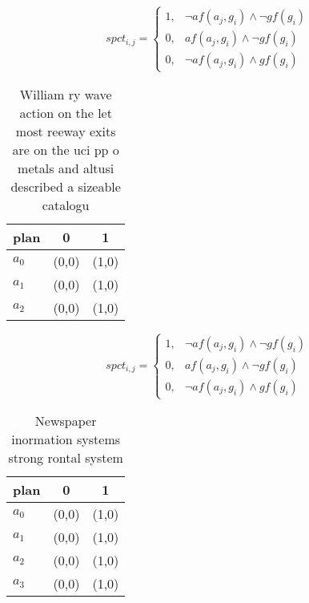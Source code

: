 \documentclass[a4paper]{article}
\begin{document}
\begin{equation}
spct_{i,j} =
\begin{cases}
1, & \text{$\neg af(a_j,g_i) \wedge \neg gf(g_i)$}\\
0, & \text{$af(a_j,g_i) \wedge \neg gf(g_i)$}\\
0, & \text{$\neg af(a_j,g_i) \wedge gf(g_i)$}
\end{cases}
\end{equation}

\begin{table}
\begin{adjustbox}{width=0.7\columnwidth}
\begin{tabular}{|l|l|l|}
\hline
\textbf{plan} & \multicolumn{1}{c|}{\textbf{0}} & \multicolumn{1}{c|}{\textbf{1}} \\ \hline
\textbf{$a_0$}  & (0,0) & (1,0) \\ \hline
\textbf{$a_1$}  & (0,0) & (1,0) \\ \hline
\textbf{$a_2$}  & (0,0) & (1,0) \\ \hline
\end{tabular}
\end{adjustbox}
\caption{William ry wave action on the let most reeway exits are on the uci pp o metals and altusi described a sizeable catalogu
}
\end{table}

\begin{equation}
spct_{i,j} =
\begin{cases}
1, & \text{$\neg af(a_j,g_i) \wedge \neg gf(g_i)$}\\
0, & \text{$af(a_j,g_i) \wedge \neg gf(g_i)$}\\
0, & \text{$\neg af(a_j,g_i) \wedge gf(g_i)$}
\end{cases}
\end{equation}

\begin{table}
\begin{adjustbox}{width=0.7\columnwidth}
\begin{tabular}{|l|l|l|}
\hline
\textbf{plan} & \multicolumn{1}{c|}{\textbf{0}} & \multicolumn{1}{c|}{\textbf{1}} \\ \hline
\textbf{$a_0$}  & (0,0) & (1,0) \\ \hline
\textbf{$a_1$}  & (0,0) & (1,0) \\ \hline
\textbf{$a_2$}  & (0,0) & (1,0) \\ \hline
\textbf{$a_3$}  & (0,0) & (1,0) \\ \hline
\end{tabular}
\end{adjustbox}
\caption{Newspaper inormation systems strong rontal system
}
\end{table}
\end{document}
